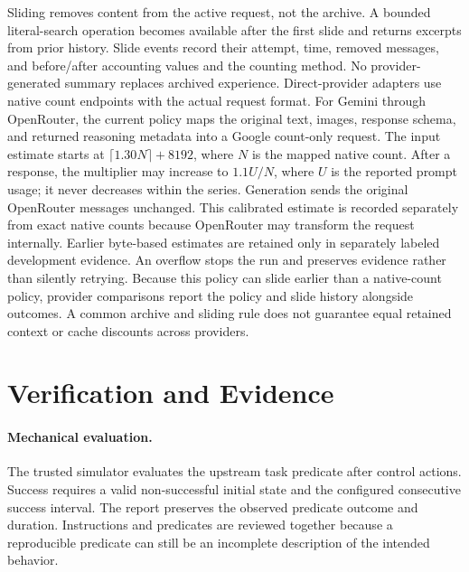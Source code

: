 \documentclass[11pt]{article}
\begin{document}
Sliding removes content from the active request, not the archive. A bounded literal-search operation becomes available after the first slide and returns excerpts from prior history. Slide events record their attempt, time, removed messages, and before/after accounting values and the counting method. No provider-generated summary replaces archived experience. Direct-provider adapters use native count endpoints with the actual request format. For Gemini through OpenRouter, the current policy maps the original text, images, response schema, and returned reasoning metadata into a Google count-only request. The input estimate starts at $\lceil 1.30 N \rceil + 8192$, where $N$ is the mapped native count. After a response, the multiplier may increase to $1.1 U/N$, where $U$ is the reported prompt usage; it never decreases within the series. Generation sends the original OpenRouter messages unchanged. This calibrated estimate is recorded separately from exact native counts because OpenRouter may transform the request internally. Earlier byte-based estimates are retained only in separately labeled development evidence. An overflow stops the run and preserves evidence rather than silently retrying. Because this policy can slide earlier than a native-count policy, provider comparisons report the policy and slide history alongside outcomes. A common archive and sliding rule does not guarantee equal retained context or cache discounts across providers.

\section{Verification and Evidence}
\paragraph{Mechanical evaluation.}
The trusted simulator evaluates the upstream task predicate after control actions. Success requires a valid non-successful initial state and the configured consecutive success interval. The report preserves the observed predicate outcome and duration. Instructions and predicates are reviewed together because a reproducible predicate can still be an incomplete description of the intended behavior.
\end{document}
